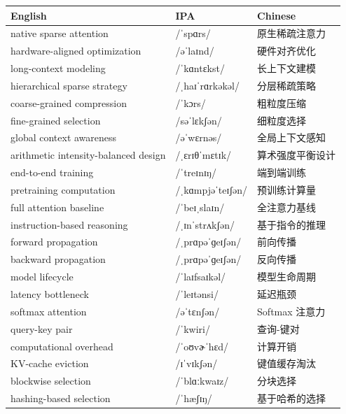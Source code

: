 \documentclass[UTF8,12pt,a4paper]{ctexart}
\providecommand{\zh}[1]{#1}
\begin{document}
\begin{tabular*}{\textwidth}{@{\extracolsep{\fill}}lll@{}}
\toprule
\textbf{English} & \textbf{IPA} & \textbf{Chinese} \\
\midrule
native sparse attention & {\ipafont /ˈspɑrs/} & \zh{原生稀疏注意力} \\
hardware-aligned optimization & {\ipafont /əˈlaɪnd/} & \zh{硬件对齐优化} \\
long-context modeling & {\ipafont /ˈkɑntɛkst/} & \zh{长上下文建模} \\
hierarchical sparse strategy & {\ipafont /ˌhaɪˈrɑrkəkəl/} & \zh{分层稀疏策略} \\
coarse-grained compression & {\ipafont /ˈkɔrs/} & \zh{粗粒度压缩} \\
fine-grained selection & {\ipafont /səˈlɛkʃən/} & \zh{细粒度选择} \\
global context awareness & {\ipafont /əˈwɛrnəs/} & \zh{全局上下文感知} \\
arithmetic intensity-balanced design & {\ipafont /ˌɛrɪθˈmɛtɪk/} & \zh{算术强度平衡设计} \\
end-to-end training & {\ipafont /ˈtreɪnɪŋ/} & \zh{端到端训练} \\
pretraining computation & {\ipafont /ˌkɑmpjəˈteɪʃən/} & \zh{预训练计算量} \\
full attention baseline & {\ipafont /ˈbeɪˌslaɪn/} & \zh{全注意力基线} \\
instruction-based reasoning & {\ipafont /ˌɪnˈstrʌkʃən/} & \zh{基于指令的推理} \\
forward propagation & {\ipafont /ˌprɑpəˈɡeɪʃən/} & \zh{前向传播} \\
backward propagation & {\ipafont /ˌprɑpəˈɡeɪʃən/} & \zh{反向传播} \\
model lifecycle & {\ipafont /ˈlaɪfsaɪkəl/} & \zh{模型生命周期} \\
latency bottleneck & {\ipafont /ˈleɪtənsi/} & \zh{延迟瓶颈} \\
softmax attention & {\ipafont /əˈtɛnʃən/} & \zh{Softmax 注意力} \\
query-key pair & {\ipafont /ˈkwiri/} & \zh{查询-键对} \\
computational overhead & {\ipafont /ˈoʊvɚˈhɛd/} & \zh{计算开销} \\
KV-cache eviction & {\ipafont /ɪˈvɪkʃən/} & \zh{键值缓存淘汰} \\
blockwise selection & {\ipafont /ˈblɑːkwaɪz/} & \zh{分块选择} \\
hashing-based selection & {\ipafont /ˈhæʃɪŋ/} & \zh{基于哈希的选择} \\

\end{tabular*}
\end{document}
